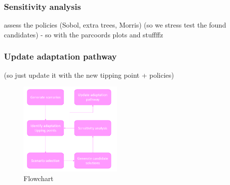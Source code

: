 \subsubsection{Sensitivity analysis}
assess the policies (Sobol, extra trees, Morris) (so we stress test the found candidates) - so with the parcoords plots and stuffffz

\subsubsection{Update adaptation pathway}
(so just update it with the new tipping point + policies)


\begin{figure}[h!]
    \centering
    \includegraphics[width=0.45\textwidth]{report/figures/flowchart.png} 
    \caption{Flowchart}
    \label{fig:flowchart}
\end{figure}






